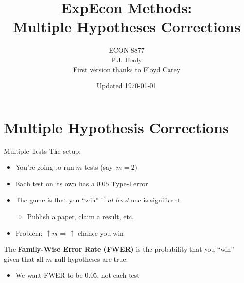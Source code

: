 

\title{ExpEcon Methods:\\Multiple Hypotheses Corrections}
\author[ECON 8877]{ECON 8877\\P.J. Healy\\First version thanks to Floyd Carey} \color{metrop}
\institute[OSU]{}
\date[]{\vfill {\tiny Updated \today}}




\frame{\maketitle}





\section{Multiple Hypothesis Corrections}

\begin{frame}{Multiple Tests}
The setup:
\begin{itemize}
    \item You're going to run $m$ tests (say, $m=2$)
    \item Each test on its own has a 0.05 Type-I error
    \item The game is that you ``win'' if \textit{at least} one is significant
    \begin{itemize}
        \item Publish a paper, claim a result, etc.
    \end{itemize}
    \item Problem: $\uparrow m \Rightarrow \uparrow$ chance you win
\end{itemize}
\begin{definition}
    The \textbf{Family-Wise Error Rate (FWER)} is the probability that you ``win'' given that all $m$ null hypotheses are true.
\end{definition}
\begin{itemize}
    \item We want FWER to be 0.05, not each test
\end{itemize}
    
\end{frame}

